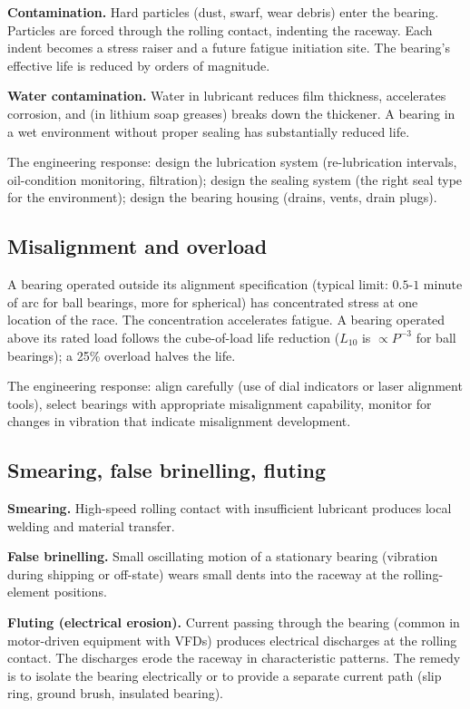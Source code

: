 \textbf{Contamination.} Hard particles (dust, swarf, wear debris) enter the bearing. Particles are forced through the rolling contact, indenting the raceway. Each indent becomes a stress raiser and a future fatigue initiation site. The bearing's effective life is reduced by orders of magnitude.

\textbf{Water contamination.} Water in lubricant reduces film thickness, accelerates corrosion, and (in lithium soap greases) breaks down the thickener. A bearing in a wet environment without proper sealing has substantially reduced life.

The engineering response: design the lubrication system (re-lubrication intervals, oil-condition monitoring, filtration); design the sealing system (the right seal type for the environment); design the bearing housing (drains, vents, drain plugs).

\subsection{Misalignment and overload}

A bearing operated outside its alignment specification (typical limit: $0.5$-$1$ minute of arc for ball bearings, more for spherical) has concentrated stress at one location of the race. The concentration accelerates fatigue. A bearing operated above its rated load follows the cube-of-load life reduction ($L_{10}$ is $\propto P^{-3}$ for ball bearings); a 25\% overload halves the life.

The engineering response: align carefully (use of dial indicators or laser alignment tools), select bearings with appropriate misalignment capability, monitor for changes in vibration that indicate misalignment development.

\subsection{Smearing, false brinelling, fluting}

\textbf{Smearing.} High-speed rolling contact with insufficient lubricant produces local welding and material transfer.

\textbf{False brinelling.} Small oscillating motion of a stationary bearing (vibration during shipping or off-state) wears small dents into the raceway at the rolling-element positions.

\textbf{Fluting (electrical erosion).} Current passing through the bearing (common in motor-driven equipment with VFDs) produces electrical discharges at the rolling contact. The discharges erode the raceway in characteristic patterns. The remedy is to isolate the bearing electrically or to provide a separate current path (slip ring, ground brush, insulated bearing).


